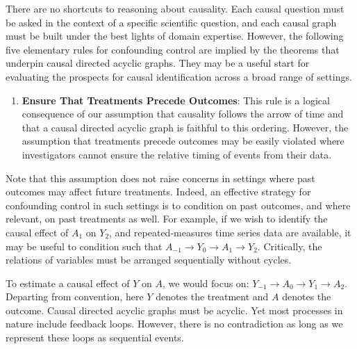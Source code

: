 \documentclass[
  single column]{article}
\providecommand{\tightlist}{%
  \setlength{\itemsep}{0pt}\setlength{\parskip}{0pt}}\usepackage{longtable,booktabs,array}
\begin{document}
There are no shortcuts to reasoning about causality. Each causal
question must be asked in the context of a specific scientific question,
and each causal graph must be built under the best lights of domain
expertise. However, the following five elementary rules for confounding
control are implied by the theorems that underpin causal directed
acyclic graphs. They may be a useful start for evaluating the prospects
for causal identification across a broad range of settings.

\begin{enumerate}
\def\labelenumi{\arabic{enumi}.}
\tightlist
\item
  \textbf{Ensure That Treatments Precede Outcomes}: This rule is a
  logical consequence of our assumption that causality follows the arrow
  of time and that a causal directed acyclic graph is faithful to this
  ordering. However, the assumption that treatments precede outcomes may
  be easily violated where investigators cannot ensure the relative
  timing of events from their data.
\end{enumerate}

Note that this assumption does not raise concerns in settings where past
outcomes may affect future treatments. Indeed, an effective strategy for
confounding control in such settings is to condition on past outcomes,
and where relevant, on past treatments as well. For example, if we wish
to identify the causal effect of \(A_1\) on \(Y_2\), and
repeated-measures time series data are available, it may be useful to
condition such that
\(\boxed{A_{-1}} \to \boxed{Y_0} \to A_1 \rightarrow Y_2\). Critically,
the relations of variables must be arranged sequentially without cycles.

To estimate a causal effect of \(Y\) on \(A\), we would focus on:
\(\boxed{Y_{-1}} \to \boxed{A_0} \to Y_1 \rightarrow A_2\). Departing
from convention, here \(Y\) denotes the treatment and \(A\) denotes the
outcome. Causal directed acyclic graphs must be acyclic. Yet most
processes in nature include feedback loops. However, there is no
contradiction as long as we represent these loops as sequential events.
\end{document}
